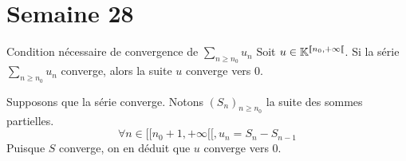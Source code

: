 \documentclass{article}
\renewenvironment{question_kholle}[2][ ]
{
	\subsection{\texorpdfstring{#2}{}}
	\notblank{#1}
	{
		\noindent #1
		\bigbreak
	}
	{}
	\begin{proof}
}
{
	\end{proof}
}
\begin{document}
\pagebreak\section{Semaine 28}

\begin{question_kholle}{Condition nécessaire de convergence de $\sum_{n \geqslant n_0} u_n$}
  Soit $u \in \mathbb K^{[ \! [ n_{0}, + \infty [ \![}$.
  Si la série $\sum_{n\geqslant n_{0}}u_{n}$ converge, alors la suite $u$ converge vers $0$.

  Supposons que la série converge. Notons $(S_{n})_{n\geqslant n_{0}}$ la suite des sommes partielles.
  $$\forall n \in [ \! [ n_{0}+1, +\infty [ \![, u_{n} = S_{n} - S_{n-1}$$
  Puisque $S$ converge, on en déduit que $u$ converge vers $0$.
\end{question_kholle}
\end{document}
